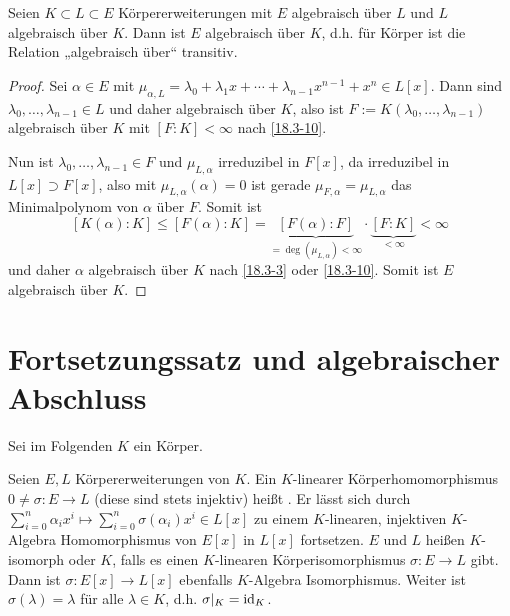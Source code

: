 \begin{st} \label{18.3-12}
	Seien $K \subset L \subset E$ Körpererweiterungen mit $E$ algebraisch über $L$ und $L$ algebraisch über $K$.
	Dann ist $E$ algebraisch über $K$, d.h. für Körper ist die Relation „algebraisch über“ transitiv.
	\begin{proof}
		Sei $\alpha \in E$ mit $\mu_{\alpha, L} = \lambda_0 + \lambda_1 x + \dotsb + \lambda_{n-1} x^{n-1} + x^n \in L[x]$.
		Dann sind $\lambda_0, \dotsc, \lambda_{n-1} \in L$ und daher algebraisch über $K$, also ist $F := K(\lambda_0, \dotsc, \lambda_{n-1})$ algebraisch über $K$ mit $[F : K] < \infty$ nach \ref{18.3-10}.

		Nun ist $\lambda_0, \dotsc, \lambda_{n-1} \in F$ und $\mu_{L, \alpha}$ irreduzibel in $F[x]$, da irreduzibel in $L[x] \supset F[x]$, also mit $\mu_{L, \alpha}(\alpha) = 0$ ist gerade $\mu_{F, \alpha} = \mu_{L, \alpha}$ das Minimalpolynom von $\alpha$ über $F$.
		Somit ist
		\[
			[K(\alpha) : K]
			\le [F(\alpha) : K]
			= \underbrace{[F(\alpha) : F]}_{=\deg(\mu_{L, \alpha}) < \infty} \cdot \underbrace{[F : K]}_{< \infty}
			< \infty
		\]
		und daher $\alpha$ algebraisch über $K$ nach \ref{18.3-3} oder \ref{18.3-10}.
		Somit ist $E$ algebraisch über $K$.
	\end{proof}
\end{st}


\section{Fortsetzungssatz und algebraischer Abschluss}


Sei im Folgenden $K$ ein Körper.

\begin{df} \label{18.4-1}
	Seien $E, L$ Körpererweiterungen von $K$.
	Ein $K$-linearer Körperhomomorphismus $0 \neq \sigma: E \to L$ (diese sind stets injektiv) heißt .
	Er lässt sich durch $\sum_{i=0}^n \alpha_i x^i \mapsto \sum_{i=0}^n \sigma(\alpha_i)x^i \in L[x]$ zu einem $K$-linearen, injektiven $K$-Algebra Homomorphismus von $E[x]$ in $L[x]$ fortsetzen.
	$E$ und $L$ heißen $K$-isomorph oder  $K$, falls es einen $K$-linearen Körperisomorphismus $\sigma: E \to L$ gibt.
	Dann ist $\sigma: E[x] \to L[x]$ ebenfalls $K$-Algebra Isomorphismus.
	Weiter ist $\sigma(\lambda) = \lambda$ für alle $\lambda \in K$, d.h. $\sigma|_K = \operatorname{id}_K$.
\end{df}

